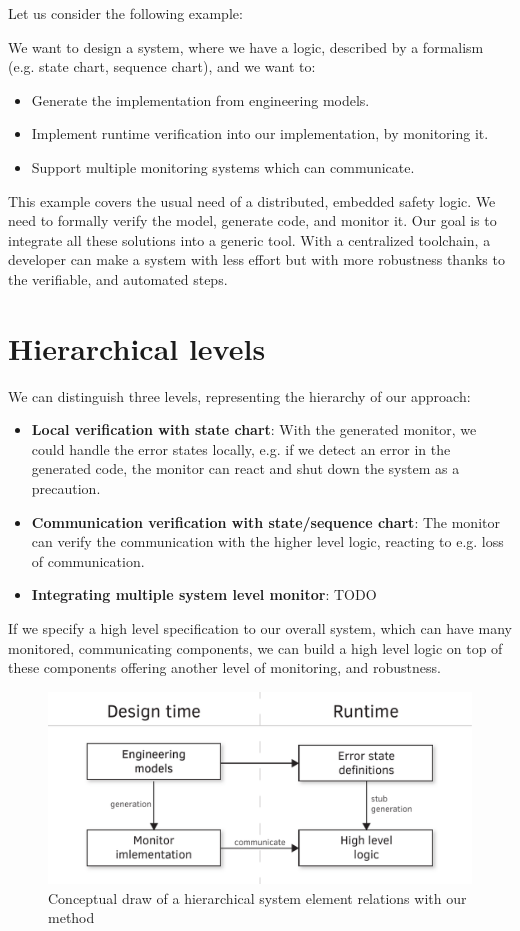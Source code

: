\noindent Let us consider the following example:

We want to design a system, where we have a logic, described by a formalism (e.g. state chart, sequence chart), and we want to:
\begin{itemize}
	\item Generate the implementation from engineering models.
	\item Implement runtime verification into our implementation, by monitoring it.
	\item Support multiple monitoring systems which can communicate.
\end{itemize}

This example covers the usual need of a distributed, embedded safety logic. We need to formally verify the model, generate code, and monitor it. Our goal is to integrate all these solutions into a generic tool. With a centralized toolchain, a developer can make a system with less effort but with more robustness thanks to the verifiable, and automated steps.
\\[1ex]

\section{Hierarchical levels}

We can distinguish three levels, representing the hierarchy of our approach:
\begin{itemize}
	\item \textbf{Local verification with state chart}: With the generated monitor, we could handle the error states locally, e.g. if we detect an error in the generated code, the monitor can react and shut down the system as a precaution.
	\item \textbf{Communication verification with state/sequence chart}: The monitor can verify the communication with the higher level logic, reacting to e.g. loss of communication.
	\item \textbf{Integrating multiple system level monitor}: TODO
\end{itemize}

If we specify a high level specification to our overall system, which can have many monitored, communicating components, we can build a high level logic on top of these components offering another level of monitoring, and robustness.

\begin{figure}[h]
	\centering
	\includegraphics[width=0.8\linewidth]{include/figures/chapter_3/abstract_diagram}
	\caption{Conceptual draw of a hierarchical system element relations with our method}
	\label{fig:overview:abstract_diagram}
\end{figure}

